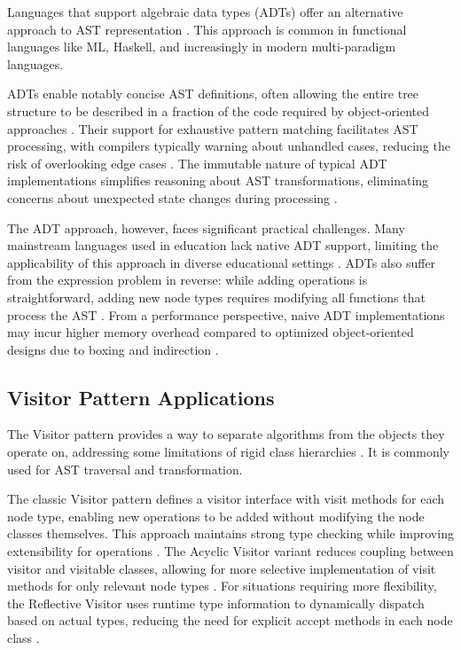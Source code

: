 Languages that support algebraic data types (ADTs) offer an alternative approach to AST representation \cite{krishnamurthi2007programming}. This approach is common in functional languages like ML, Haskell, and increasingly in modern multi-paradigm languages.

ADTs enable notably concise AST definitions, often allowing the entire tree structure to be described in a fraction of the code required by object-oriented approaches \cite{krishnamurthi2007programming}. Their support for exhaustive pattern matching facilitates AST processing, with compilers typically warning about unhandled cases, reducing the risk of overlooking edge cases \cite{odersky2004overview}. The immutable nature of typical ADT implementations simplifies reasoning about AST transformations, eliminating concerns about unexpected state changes during processing \cite{okasaki1999purely}.

The ADT approach, however, faces significant practical challenges. Many mainstream languages used in education lack native ADT support, limiting the applicability of this approach in diverse educational settings \cite{krishnamurthi2007programming}. ADTs also suffer from the expression problem in reverse: while adding operations is straightforward, adding new node types requires modifying all functions that process the AST \cite{wadler1998expression}. From a performance perspective, naive ADT implementations may incur higher memory overhead compared to optimized object-oriented designs due to boxing and indirection \cite{appel2004modern}.


\subsection{Visitor Pattern Applications}

The Visitor pattern provides a way to separate algorithms from the objects they operate on, addressing some limitations of rigid class hierarchies \cite{gamma1995design}. It is commonly used for AST traversal and transformation.

The classic Visitor pattern defines a visitor interface with visit methods for each node type, enabling new operations to be added without modifying the node classes themselves. This approach maintains strong type checking while improving extensibility for operations \cite{gamma1995design}. The Acyclic Visitor variant reduces coupling between visitor and visitable classes, allowing for more selective implementation of visit methods for only relevant node types \cite{martin2000acyclic}. For situations requiring more flexibility, the Reflective Visitor uses runtime type information to dynamically dispatch based on actual types, reducing the need for explicit accept methods in each node class \cite{palsberg1998essence}.

